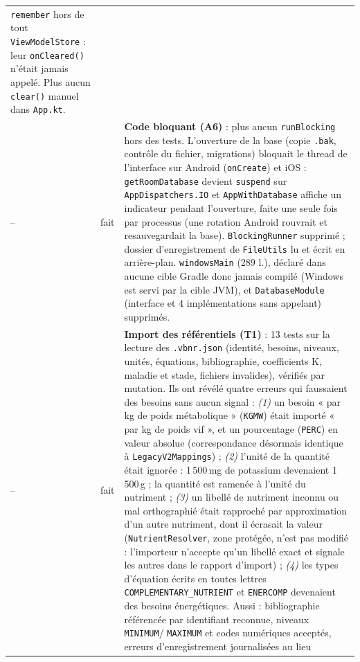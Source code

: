 \documentclass[11pt,a4paper]{article}
\newcommand{\code}[1]{\texttt{#1}}
\begin{document}
\begin{longtable}{p{0.5cm}p{3.2cm}p{11cm}}
           \code{remember} hors de tout \code{ViewModelStore} : leur \code{onCleared()} n'était jamais
           appelé. Plus aucun \code{clear()} manuel dans \code{App.kt}. \\
-- & fait & \textbf{Code bloquant (A6)} : plus aucun \code{runBlocking} hors des tests.
           L'ouverture de la base (copie \code{.bak}, contrôle du fichier, migrations) bloquait le
           thread de l'interface sur Android (\code{onCreate}) et iOS : \code{getRoomDatabase} devient
           \code{suspend} sur \code{AppDispatchers.IO} et \code{AppWithDatabase} affiche un indicateur
           pendant l'ouverture, faite une seule fois par processus (une rotation Android rouvrait et
           resauvegardait la base). \code{BlockingRunner} supprimé ; dossier d'enregistrement de
           \code{FileUtils} lu et écrit en arrière-plan. \code{windowsMain} (289 l.), déclaré dans aucune
           cible Gradle donc jamais compilé (Windows est servi par la cible JVM), et
           \code{DatabaseModule} (interface et 4 implémentations sans appelant) supprimés. \\
-- & fait & \textbf{Import des référentiels (T1)} : 13 tests sur la lecture des \code{.vbnr.json}
           (identité, besoins, niveaux, unités, équations, bibliographie, coefficients K, maladie et
           stade, fichiers invalides), vérifiés par mutation. Ils ont révélé quatre erreurs qui
           faussaient des besoins sans aucun signal :
           \emph{(1)} un besoin « par kg de poids métabolique » (\code{KGMW}) était importé « par kg
           de poids vif », et un pourcentage (\code{PERC}) en valeur absolue (correspondance désormais
           identique à \code{LegacyV2Mappings}) ;
           \emph{(2)} l'unité de la quantité était ignorée : 1\,500\,mg de potassium devenaient
           1\,500\,g ; la quantité est ramenée à l'unité du nutriment ;
           \emph{(3)} un libellé de nutriment inconnu ou mal orthographié était rapproché par
           approximation d'un autre nutriment, dont il écrasait la valeur (\code{NutrientResolver},
           zone protégée, n'est pas modifié : l'importeur n'accepte qu'un libellé exact et signale les
           autres dans le rapport d'import) ;
           \emph{(4)} les types d'équation écrits en toutes lettres \code{COMPLEMENTARY\_NUTRIENT} et
           \code{ENERCOMP} devenaient des besoins énergétiques.
           Aussi : bibliographie référencée par identifiant reconnue, niveaux \code{MINIMUM}/
           \code{MAXIMUM} et codes numériques acceptés, erreurs d'enregistrement journalisées au lieu

\end{longtable}
\end{document}
